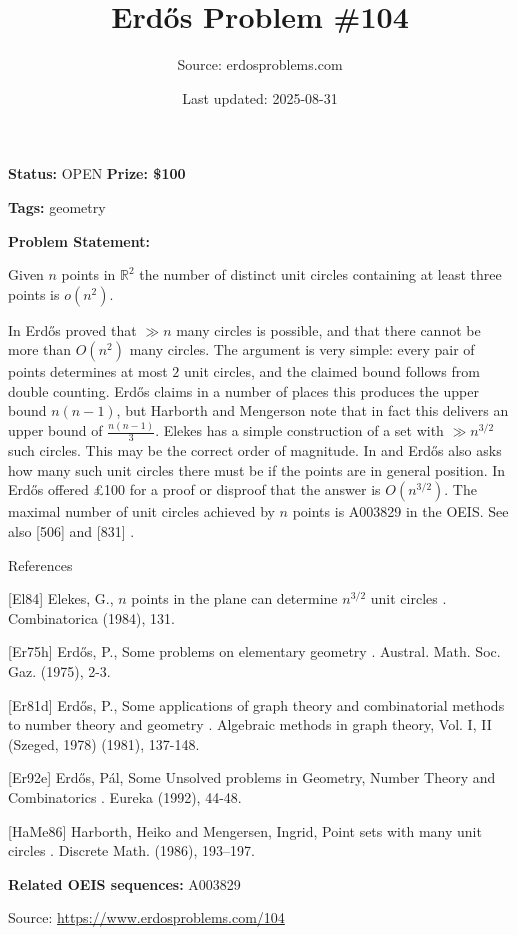 \documentclass{article}
\title{Erd\H{o}s Problem \#104}
\date{Last updated: 2025-08-31}
\author{Source: erdosproblems.com}
\begin{document}
\maketitle

\noindent\textbf{Status:} OPEN \quad \textbf{Prize: \$100}

\noindent\textbf{Tags:} geometry

\medskip

\noindent\textbf{Problem Statement:}

Given $n$ points in $\mathbb{R}^2$ the number of distinct unit circles containing at least three points is $o(n^2)$.




In \cite{Er81d} Erd\H{o}s proved that $\gg n$ many circles is possible, and that there cannot be more than $O(n^2)$ many circles. The argument is very simple: every pair of points determines at most $2$ unit circles, and the claimed bound follows from double counting. Erd\H{o}s claims in a number of places this produces the upper bound $n(n-1)$, but Harborth and Mengerson \cite{HaMe86} note that in fact this delivers an upper bound of $\frac{n(n-1)}{3}$. Elekes \cite{El84} has a simple construction of a set with $\gg n^{3/2}$ such circles. This may be the correct order of magnitude. In \cite{Er75h} and \cite{Er92e} Erd\H{o}s also asks how many such unit circles there must be if the points are in general position. In \cite{Er92e} Erd\H{o}s offered £100 for a proof or disproof that the answer is $O(n^{3/2})$. The maximal number of unit circles achieved by $n$ points is A003829 in the OEIS. See also [506] and [831] .




References

[El84] Elekes, G., {$n$} points in the plane can determine $n^{3/2}$ unit circles . Combinatorica (1984), 131.

[Er75h] Erd\H{o}s, P., Some problems on elementary geometry . Austral. Math. Soc. Gaz. (1975), 2-3.

[Er81d] Erd\H{o}s, P., Some applications of graph theory and combinatorial methods to number theory and geometry . Algebraic methods in graph theory, Vol. I, II (Szeged, 1978) (1981), 137-148.

[Er92e] Erd\H{o}s, P\'{a}l, Some Unsolved problems in Geometry, Number Theory and Combinatorics . Eureka (1992), 44-48.

[HaMe86] Harborth, Heiko and Mengersen, Ingrid, Point sets with many unit circles . Discrete Math. (1986), 193--197.

\noindent\textbf{Related OEIS sequences:} A003829


\bigskip
\noindent\small{Source: \url{https://www.erdosproblems.com/104}}
\end{document}
